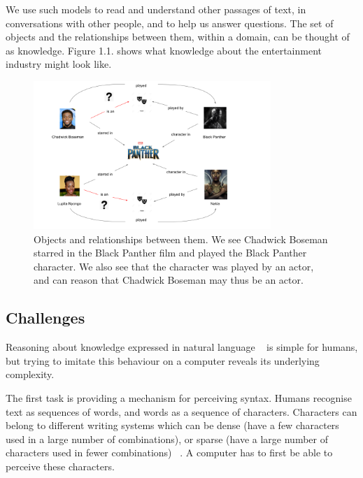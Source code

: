 \noindent We use such models to read and understand other passages of text, in conversations with other people, and to help us answer questions. The set of objects and the relationships between them, within a domain, can be thought of as knowledge. Figure 1.1. shows what knowledge about the entertainment industry might look like. 

\begin{figure} [H]
   	\centering
    	\includegraphics[width=0.8\textwidth, height=0.4\textheight]{Entities_and_the_Relationships_Between_Them}
	\captionsetup{justification=centering}
	\caption{Objects and relationships between them. We see Chadwick Boseman starred in the Black Panther film and played the Black Panther character. We also see that the character was played by an actor, and can reason that Chadwick Boseman may thus be an actor.}
\end{figure}

\subsection{Challenges} 

Reasoning about knowledge expressed in natural language \unskip~\citep{minervini2019differentiable} is simple for humans, but trying to imitate this behaviour on a computer reveals its underlying complexity. \par

\noindent The first task is providing a mechanism for perceiving syntax. Humans recognise text as sequences of words, and words as a sequence of characters. Characters can belong to different writing systems which can be dense (have a few characters used in a large number of combinations), or sparse (have a large number of characters used in fewer combinations) \unskip~\citep{Hua2010}. A computer has to first be able to perceive these characters. \par

